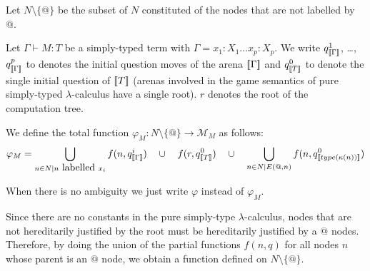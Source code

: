 Let $N\setminus \{@\}$ be the subset of $N$ constituted of the nodes that are not labelled by $@$.
\begin{dfn}
Let $\Gamma \vdash M : T$ be a simply-typed term
with $\Gamma = x_1:X_1 \ldots x_p : X_p$.
We write $q_{{[\![ \Gamma ]\!]}}^1$, \ldots, $q_{{[\![ \Gamma ]\!]}}^p$ to denotes the initial question moves of the arena ${[\![ \Gamma ]\!]}$ and $q^0_{[\![ T ]\!]}$ to denote the single initial question of ${[\![ T ]\!]}$ (arenas involved in the game semantics of pure simply-typed $\lambda$-calculus have a single root).
$r$ denotes the root of the computation tree.

We define the total function $\varphi_M : N\setminus \{@\} \rightarrow \mathcal{M}_M$ as follows:
$$\varphi_M =  \bigcup_{n \in N | n \mbox{ labelled } x_i }  f(n, q^i_{{[\![ \Gamma ]\!]}} )
    \quad  \cup \quad
        f(r, q^0_{{[\![ T ]\!]}})
    \quad  \cup \quad
        \bigcup_{n \in N | E(@,n)}  f(n, q^0_{{[\![ type(\kappa(n)) ]\!]}} )
$$
\end{dfn}
When there is no ambiguity we just write $\varphi$ instead of $\varphi_M$.

Since there are no constants in the pure simply-type $\lambda$-calculus, nodes that are not hereditarily justified
by the root must be hereditarily justified by a $@$ nodes. Therefore, by doing the union of the partial functions $f(n,q)$
for all nodes $n$ whose parent is an $@$ node, we obtain a function defined on $N\setminus \{@\}$.

